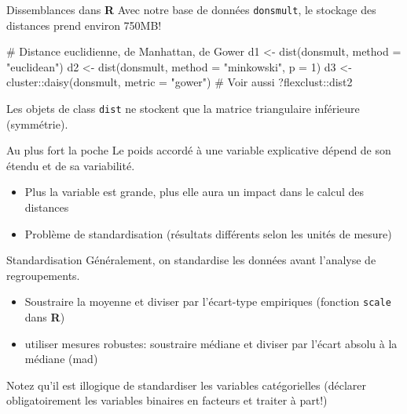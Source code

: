 \documentclass[
  ignorenonframetext,
]{beamer}
\newenvironment{Shaded}{\begin{snugshade}}{\end{snugshade}}
\newcommand{\AttributeTok}[1]{\textcolor[rgb]{0.40,0.45,0.13}{#1}}
\newcommand{\CommentTok}[1]{\textcolor[rgb]{0.37,0.37,0.37}{#1}}
\newcommand{\DecValTok}[1]{\textcolor[rgb]{0.68,0.00,0.00}{#1}}
\newcommand{\FunctionTok}[1]{\textcolor[rgb]{0.28,0.35,0.67}{#1}}
\newcommand{\NormalTok}[1]{\textcolor[rgb]{0.00,0.23,0.31}{#1}}
\newcommand{\OtherTok}[1]{\textcolor[rgb]{0.00,0.23,0.31}{#1}}
\newcommand{\SpecialCharTok}[1]{\textcolor[rgb]{0.37,0.37,0.37}{#1}}
\newcommand{\StringTok}[1]{\textcolor[rgb]{0.13,0.47,0.30}{#1}}
\providecommand{\tightlist}{%
  \setlength{\itemsep}{0pt}\setlength{\parskip}{0pt}}\usepackage{longtable,booktabs,array}
\begin{document}
\begin{frame}[fragile]{Dissemblances dans \textbf{R}}
\protect\hypertarget{dissemblances-dans-r}{}
Avec notre base de données \texttt{donsmult}, le stockage des distances
prend environ 750MB!

\begin{Shaded}
\begin{Highlighting}[numbers=left,,]
\CommentTok{\# Distance euclidienne, de Manhattan, de Gower}
\NormalTok{d1 }\OtherTok{\textless{}{-}} \FunctionTok{dist}\NormalTok{(donsmult, }\AttributeTok{method =} \StringTok{"euclidean"}\NormalTok{)}
\NormalTok{d2 }\OtherTok{\textless{}{-}} \FunctionTok{dist}\NormalTok{(donsmult, }\AttributeTok{method =} \StringTok{"minkowski"}\NormalTok{, }\AttributeTok{p =} \DecValTok{1}\NormalTok{)}
\NormalTok{d3 }\OtherTok{\textless{}{-}}\NormalTok{ cluster}\SpecialCharTok{::}\FunctionTok{daisy}\NormalTok{(donsmult, }\AttributeTok{metric =} \StringTok{"gower"}\NormalTok{)}
\CommentTok{\# Voir aussi ?flexclust::dist2}
\end{Highlighting}
\end{Shaded}

\footnotesize

Les objets de class \texttt{dist} ne stockent que la matrice
triangulaire inférieure (symmétrie).
\end{frame}

\begin{frame}{Au plus fort la poche}
\protect\hypertarget{au-plus-fort-la-poche}{}
Le poids accordé à une variable explicative dépend de son étendu et de
sa variabilité.

\begin{itemize}
\tightlist
\item
  Plus la variable est grande, plus elle aura un impact dans le calcul
  des distances
\item
  Problème de standardisation (résultats différents selon les unités de
  mesure)
\end{itemize}
\end{frame}

\begin{frame}[fragile]{Standardisation}
\protect\hypertarget{standardisation}{}
Généralement, on standardise les données avant l'analyse de
regroupements.

\begin{itemize}
\tightlist
\item
  Soustraire la moyenne et diviser par l'écart-type empiriques (fonction
  \texttt{scale} dans \textbf{R})
\item
  utiliser mesures robustes: soustraire médiane et diviser par l'écart
  absolu à la médiane (mad)
\end{itemize}

Notez qu'il est illogique de standardiser les variables catégorielles
(déclarer obligatoirement les variables binaires en facteurs et traiter
à part!)
\end{frame}
\end{document}
